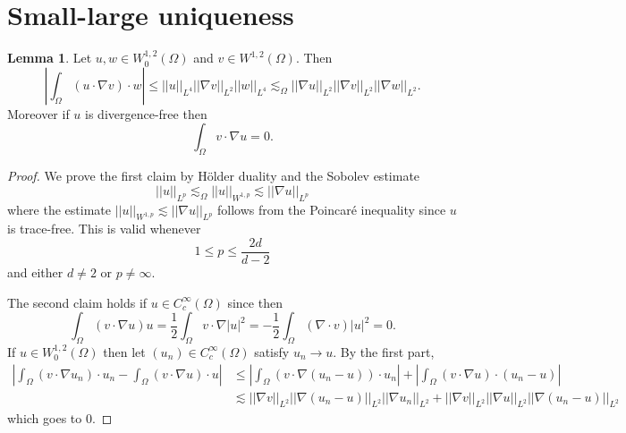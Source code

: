 \documentclass[12pt]{book}
\theoremstyle{definition}
\newtheorem{lemma}[theorem]{Lemma}
\begin{document}
\section{Small-large uniqueness}
\begin{lemma}
Let $u,w \in W^{1,2}_0(\Omega)$ and $v \in W^{1,2}(\Omega)$.
Then
$$\left|\int_\Omega (u \cdot \nabla v) \cdot w\right| \leq ||u||_{L^4} ||\nabla v||_{L^2} ||w||_{L^4} \lesssim_\Omega ||\nabla u||_{L^2} ||\nabla v||_{L^2} ||\nabla w||_{L^2}.$$
Moreover if $u$ is divergence-free then
$$\int_\Omega v \cdot \nabla u = 0.$$
\end{lemma}
\begin{proof}
We prove the first claim by H\"older duality and the Sobolev estimate
$$||u||_{L^p} \lesssim_\Omega ||u||_{W^{1,p}} \lesssim ||\nabla u||_{L^p}$$
where the estimate $ ||u||_{W^{1,p}} \lesssim ||\nabla u||_{L^p}$ follows from the Poincar\'e inequality since $u$ is trace-free.
This is valid whenever
$$1 \leq p \leq \frac{2d}{d - 2}$$
and either $d \neq 2$ or $p \neq \infty$.

The second claim holds if $u \in C^\infty_c(\Omega)$ since then
$$\int_\Omega (v \cdot \nabla u)u = \frac{1}{2} \int_\Omega v \cdot \nabla |u|^2 = -\frac{1}{2} \int_\Omega (\nabla \cdot v) |u|^2 = 0.$$
If $u \in W^{1,2}_0(\Omega)$ then let $(u_n) \in C^\infty_c(\Omega)$ satisfy $u_n \to u$. By the first part,
\begin{align*}
\left|\int_\Omega (v \cdot \nabla u_n) \cdot u_n - \int_\Omega (v \cdot \nabla u) \cdot u\right|
&\leq \left|\int_\Omega (v \cdot \nabla(u_n - u)) \cdot u_n\right| + \left|\int_\Omega (v \cdot \nabla u) \cdot (u_n - u)\right|\\
&\lesssim ||\nabla v||_{L^2} ||\nabla(u_n - u)||_{L^2} ||\nabla u_n||_{L^2} + ||\nabla v||_{L^2} ||\nabla u||_{L^2} ||\nabla(u_n - u)||_{L^2}
\end{align*}
which goes to $0$.
\end{proof}
\end{document}
